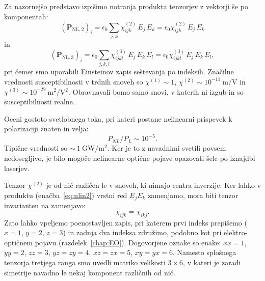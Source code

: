 Za nazornejšo predstavo izpišimo notranja produkta tenzorjev z vektorji še 
po komponentah:
\begin{equation}
\left(\mathbf{P}_{\mathrm{NL,2}}\right)_i= 
\epsilon_{0}\sum_{j,k}\chi^{(2)}_{ijk} \,E_j \,E_k =
\epsilon_{0}\chi^{(2)}_{ijk} \,E_j \,E_k 
\label{eq:nlin2}
\end{equation}
in
\begin{equation}
\left(\mathbf{P}_{\mathrm{NL,3}}\right)_i= 
\epsilon_{0}\sum_{j,k,l}\chi^{(3)}_{ijkl} \,E_j \,E_k\, E_l=
\epsilon_{0}\chi^{(3)}_{ijkl} \,E_j \,E_k\, E_l,
\label{eq:nlin3}
\end{equation}
pri čemer smo uporabili Einsteinov zapis seštevanja po indeksih. Značilne vrednosti
susceptibilnosti v trdnih snoveh so $\chi^{(1)} \sim 1$, 
$\chi^{(2)} \sim 10^{-11}~\si{\metre/\volt}$ 
in $\chi^{(3)} \sim 10^{-22}~\si{\metre^2/\volt^2}$. Obravnavali bomo samo snovi, v katerih
ni izgub in so susceptibilnosti realne.

\begin{naloga}
Oceni gostoto svetlobnega toka, pri kateri postane nelinearni 
prispevek k polarizaciji znaten in velja:
 $$P_{NL}/P_L \sim 10^{-5}.$$
Tipične vrednosti so $\sim~1~\si{\giga\watt/\metre^2}$. Ker je to z navadnimi
svetili povsem nedosegljivo, je bilo mogoče nelinearne
optične pojave opazovati šele po iznajdbi laserjev.
\end{naloga}
 
Tenzor $\chi^{(2)}$ je od nič različen le v snoveh, ki nimajo centra inverzije. 
Ker lahko v produktu (enačba~\ref{eq:nlin2}) vrstni red $E_j E_k$ zamenjamo, mora biti
tenzor invarianten na zamenjavo:
\begin{equation}
\chi_{ijk} = \chi_{ikj}.
\label{eq:chijk}
\end{equation}
Zato lahko vpeljemo poenostavljen zapis, pri katerem prvi indeks 
prepišemo ($x=1$, $y=2$, $z=3$) in zadnja dva indeksa združimo, 
podobno kot pri elektro-optičnem pojavu (razdelek~\ref{chap:EO}).
Dogovorjene oznake so enake: $xx=1$, $yy=2$, $zz=3$, $yz=zy=4$, 
$xz=zx=5$, $xy=yx=6$. Namesto
splošnega tenzorja tretjega ranga smo uvedli matriko velikosti $3\times6$,
v kateri je zaradi simetrije navadno le nekaj komponent 
različnih od nič. 

